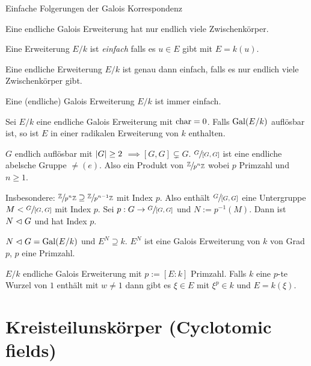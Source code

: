 Einfache Folgerungen der Galois Korrespondenz
\begin{corollary}
	Eine endliche Galois Erweiterung hat nur endlich viele Zwischenkörper.
\end{corollary}

\begin{definition}
	Eine Erweiterung $E / k$ ist \emph{einfach} falls es $u \in E$ gibt mit $E = k(u)$.
\end{definition}

\begin{proposition}
	Eine endliche Erweiterung $E / k$ ist genau dann einfach, falls es nur endlich viele Zwischenkörper gibt.
\end{proposition}


\begin{corollary}
	Eine (endliche) Galois Erweiterung $E / k$ ist immer einfach.
\end{corollary}


\begin{theorem}
	Sei $E / k$ eine endliche Galois Erweiterung mit $\operatorname{char} = 0$. Falls $\operatorname{Gal}(E / k)$ auflösbar ist, so ist $E$ in einer radikalen Erweiterung von $k$ enthalten.
\end{theorem}

$G$ endlich auflösbar mit $\abs{G} \geq 2$ $\implies [G,G]  \subsetneq G$.
$\sfrac{G}{[G,G]}$ ist eine endliche abelsche Gruppe $\neq (e)$. Also ein Produkt von $\sfrac{\mathbb{Z}}{p^{n} \mathbb{Z}}$ wobei $p$ Primzahl und $n \geq 1$.

Insbesondere: $\sfrac{\mathbb{Z}}{p^{n}\mathbb{Z}} \supseteq \sfrac{\mathbb{Z}}{p^{n-1} \mathbb{Z}}$ mit Index $p$.
Also enthält $\sfrac{G}{[G,G]}$ eine Untergruppe $M < \sfrac{G}{[G,G]}$ mit Index $p$.
Sei $p : G \to \sfrac{G}{[G,G]}$ und $N := p^{-1}(M)$. Dann ist $N \vartriangleleft G$ und hat Index $p$.

$N \vartriangleleft G = \operatorname{Gal}(E / k)$ und $E^{N} \supseteq k$.
$E^{N}$ ist eine Galois Erweiterung von $k$ von Grad $p$, $p$ eine Primzahl.

\begin{lemma}
	$E / k$ endliche Galois Erweiterung mit  $p := [E : k]$ Primzahl.
	Falls $k$ eine $p$-te Wurzel von $1$ enthält mit $w \neq 1$ dann gibt es $\xi \in E$ mit $\xi^{p} \in k$ und $E = k(\xi)$.
\end{lemma}



\section{Kreisteilunskörper (Cyclotomic fields)}

